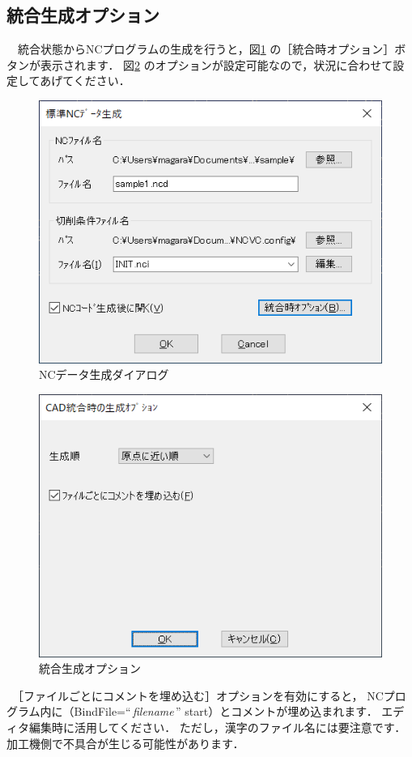 \subsection{統合生成オプション}
　統合状態からNCプログラムの生成を行うと，図\ref{fig:option1.png} の［統合時オプション］ボタンが表示されます．
図\ref{fig:option2.png} のオプションが設定可能なので，状況に合わせて設定してあげてください．

\begin{minipage}[t]{0.5\textwidth}
\begin{figure}[H]
\centering
\includegraphics[scale=0.7]{No1/fig/option1.png}
\caption{NCデータ生成ダイアログ}
\label{fig:option1.png}
\end{figure}
\end{minipage}
\begin{minipage}[t]{0.5\textwidth}
\begin{figure}[H]
\centering
\includegraphics[scale=0.7]{No1/fig/option2.png}
\caption{統合生成オプション}
\label{fig:option2.png}
\end{figure}
\end{minipage}

\vspace*{2zh}
　［ファイルごとにコメントを埋め込む］オプションを有効にすると，
NCプログラム内に（BindFile=``\,\textit{filename}\,'' start）とコメントが埋め込まれます．
エディタ編集時に活用してください．
ただし，漢字のファイル名には要注意です．
加工機側で不具合が生じる可能性があります．
